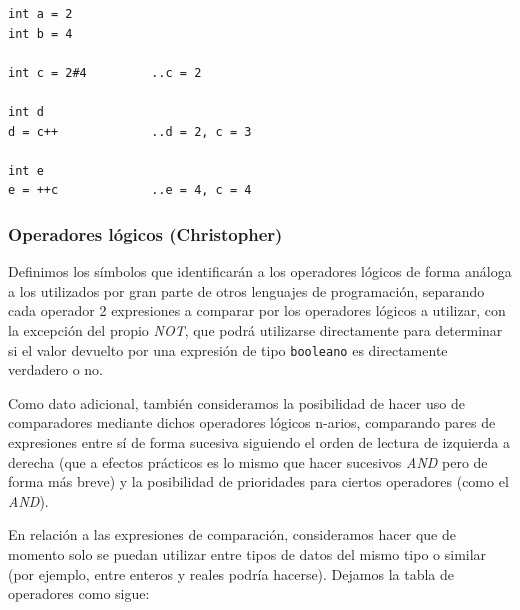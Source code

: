 \documentclass[11pt, english]{article}
\begin{document}
\begin{lstlisting}[caption=Ejemplo de uso los operadores artiméticos]
int a = 2
int b = 4

int c = 2#4			..c = 2

int d
d = c++				..d = 2, c = 3

int e
e = ++c				..e = 4, c = 4
\end{lstlisting}

\subsubsection{Operadores lógicos (Christopher)}
Definimos los símbolos que identificarán a los operadores lógicos de forma análoga a los utilizados por gran parte de otros lenguajes de programación, separando cada operador 2 expresiones a comparar por los operadores lógicos a utilizar, con la excepción del propio \emph{NOT}, que podrá utilizarse directamente para determinar si el valor devuelto por una expresión de tipo \texttt{booleano} es directamente verdadero o no. 


Como dato adicional, también consideramos la posibilidad de hacer uso de comparadores mediante dichos operadores lógicos n-arios, comparando pares de expresiones entre sí de forma sucesiva siguiendo el orden de lectura de izquierda a derecha (que a efectos prácticos es lo mismo que hacer sucesivos \emph{AND} pero de forma más breve) y la posibilidad de prioridades para ciertos operadores (como el \emph{AND}). \vspace{0px}

En relación a las expresiones de comparación, consideramos hacer que de momento solo se puedan utilizar entre tipos de datos del mismo tipo o similar (por ejemplo, entre enteros y reales podría hacerse). Dejamos la tabla de operadores como sigue: \vspace{0px}
\end{document}
